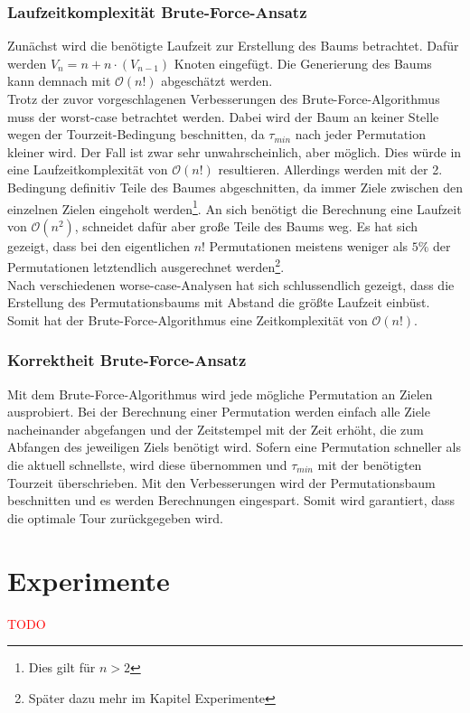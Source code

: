 \documentclass[german,version-2019-11]{uzl-thesis}
\begin{document}
\subsection{Laufzeitkomplexität Brute-Force-Ansatz}
Zunächst wird die benötigte Laufzeit zur Erstellung des Baums betrachtet. Dafür werden $V_n = n + n\cdot (V_{n-1})$ Knoten eingefügt. Die Generierung des Baums kann demnach mit $\mathcal{O}(n!)$ abgeschätzt werden. \\
Trotz der zuvor vorgeschlagenen Verbesserungen des Brute-Force-Algorithmus muss der worst-case betrachtet werden. Dabei wird der Baum an keiner Stelle wegen der Tourzeit-Bedingung  beschnitten, da $\tau_{min}$ nach jeder Permutation kleiner wird. Der Fall ist zwar sehr unwahrscheinlich, aber möglich. Dies würde in eine Laufzeitkomplexität von $\mathcal{O}(n!)$ resultieren. Allerdings werden mit der 2. Bedingung definitiv Teile des Baumes abgeschnitten, da immer Ziele zwischen den einzelnen Zielen eingeholt werden\footnote{Dies gilt für $n>2$}. An sich benötigt die Berechnung eine Laufzeit von $\mathcal{O}(n^2)$, schneidet dafür aber große Teile des Baums weg. Es hat sich gezeigt, dass bei den eigentlichen $n!$ Permutationen meistens weniger als $5\%$ der Permutationen letztendlich ausgerechnet werden\footnote{Später dazu mehr im Kapitel Experimente}. \\
Nach verschiedenen worse-case-Analysen hat sich schlussendlich gezeigt, dass die Erstellung des Permutationsbaums mit Abstand die größte Laufzeit einbüst. Somit hat der Brute-Force-Algorithmus eine Zeitkomplexität von $\mathcal{O}(n!)$.


\subsection{Korrektheit Brute-Force-Ansatz}
Mit dem Brute-Force-Algorithmus wird jede mögliche Permutation an Zielen ausprobiert. Bei der Berechnung einer Permutation werden einfach alle Ziele nacheinander abgefangen und der Zeitstempel mit der Zeit erhöht, die zum Abfangen des jeweiligen Ziels benötigt wird. Sofern eine Permutation schneller als die aktuell schnellste, wird diese übernommen und $\tau_{min}$ mit der benötigten Tourzeit überschrieben. Mit den Verbesserungen wird der Permutationsbaum beschnitten und es werden Berechnungen eingespart. Somit wird garantiert, dass die optimale Tour zurückgegeben wird.


\chapter{Experimente}
\textcolor{red}{TODO} 
\end{document}
